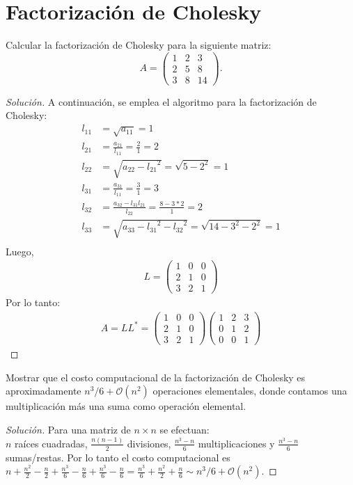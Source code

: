 \documentclass[12pt]{book}
\newenvironment{solucion}
  {\renewcommand\qedsymbol{$\square$}\begin{proof}[Solución]}
  {\end{proof}}
\begin{document}
\section{Factorización de Cholesky}
\eje Calcular la factorización de Cholesky para la siguiente matriz:
\[A=\begin{pmatrix}
1&2&3\\
2&5&8\\
3&8&14
\end{pmatrix}.\]
\begin{solucion}
A continuación, se emplea el algoritmo para la factorización de Cholesky:
\begin{align*}
    l_{11}&=\sqrt{a_{11}}= 1\\
    l_{21}&= \frac{a_{21}}{l_{11}}= \frac{2}{1}=2\\
    l_{22}&= \sqrt{a_{22}-{l_{21}}^2}= \sqrt{5-2^2}=1\\
    l_{31}&= \frac{a_{31}}{l_{11}}=\frac{3}{1}=3\\
    l_{32}&= \frac{a_{32}-l_{31}l_{21}}{l_{22}}=\frac{8-3*2}{1}=2\\
    l_{33}&= \sqrt{a_{33}-{l_{31}}^2-{l_{32}}^2}=\sqrt{14-3^2-2^2}=1\\ 
\end{align*}
Luego,
\begin{align*}
    L=\begin{pmatrix}
        1&0&0\\
        2&1&0\\
        3&2&1
    \end{pmatrix}
\end{align*} 
Por lo tanto:
\begin{align*}
    A = LL^*=\begin{pmatrix}
        1&0&0\\
        2&1&0\\
        3&2&1
    \end{pmatrix}\begin{pmatrix}
        1&2&3\\
        0&1&2\\
        0&0&1
    \end{pmatrix}
\end{align*}

\end{solucion}

\eje Mostrar que el costo computacional de la factorización de Cholesky es aproximadamente $n^3/6+\mathcal{O}(n^2)$ operaciones elementales, donde contamos una multiplicación más una suma como operación elemental.
\begin{solucion}
Para una matriz de $n\times n$ se efectuan:\\
$n$ raíces cuadradas, $\frac{n(n-1)}{2}$ divisiones,  $\frac{n^3-n}{6}$ multiplicaciones y $\frac{n^3-n}{6}$ sumas/restas. Por lo tanto el costo computacional es $n+\frac{n^2}{2}-\frac{n}{2}+\frac{n^3}{6}-\frac{n}{6}+\frac{n^3}{6}-\frac{n}{6}= \frac{n^3}{6}+\frac{n^2}{2}+\frac{n}{6} \sim n^3/6 + \mathcal{O}(n^2) $.
\end{solucion}
\end{document}
